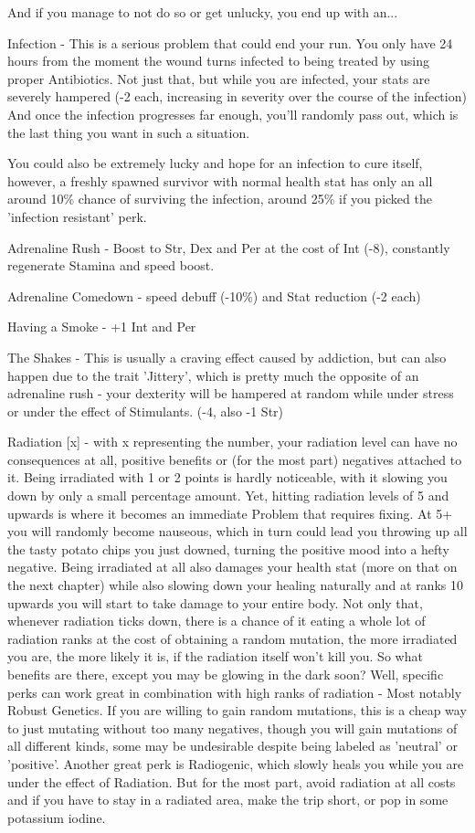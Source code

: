 \documentclass[11pt]{report}
\begin{document}
And if you manage to not do so or get unlucky, you end up with an...

Infection - This is a serious problem that could end your run. You only have 24 hours from the moment the wound turns infected to being treated by using proper Antibiotics. Not just that, but while you are infected, your stats are severely hampered (-2 each, increasing in severity over the course of the infection) And once the infection progresses far enough, you'll randomly pass out, which is the last thing you want in such a situation.

You could also be extremely lucky and hope for an infection to cure itself, however, a freshly spawned survivor with normal health stat has only an all around 10\% chance of surviving the infection, around 25\% if you picked the 'infection resistant' perk.

Adrenaline Rush - Boost to Str, Dex and Per at the cost of Int (-8), constantly regenerate Stamina and speed boost.

Adrenaline Comedown - speed debuff (-10\%) and Stat reduction (-2 each)

Having a Smoke - +1 Int and Per

The Shakes - This is usually a craving effect caused by addiction, but can also happen due to the trait 'Jittery', which is pretty much the opposite of an adrenaline rush - your dexterity will be hampered at random while under stress or under the effect of Stimulants. (-4, also -1 Str)

Radiation [x] - with x representing the number, your radiation level can have no consequences at all, positive benefits or (for the most part) negatives attached to it. Being irradiated with 1 or 2 points is hardly noticeable, with it slowing you down by only a small percentage amount. Yet, hitting radiation levels of 5 and upwards is where it becomes an immediate Problem that requires fixing. At 5+ you will randomly become nauseous, which in turn could lead you throwing up all the tasty potato chips you just downed, turning the positive mood into a hefty negative. Being irradiated at all also damages your health stat (more on that on the next chapter) while also slowing down your healing naturally and at ranks 10 upwards you will start to take damage to your entire body. Not only that, whenever radiation ticks down, there is a chance of it eating a whole lot of radiation ranks at the cost of obtaining a random mutation, the more irradiated you are, the more likely it is, if the radiation itself won't kill you. So what benefits are there, except you may be glowing in the dark soon? Well, specific perks can work great in combination with high ranks of radiation - Most notably Robust Genetics. If you are willing to gain random mutations, this is a cheap way to just mutating without too many negatives, though you will gain mutations of all different kinds, some may be undesirable despite being labeled as 'neutral' or 'positive'. Another great perk is Radiogenic, which slowly heals you while you are under the effect of Radiation. But for the most part, avoid radiation at all costs and if you have to stay in a radiated area, make the trip short, or pop in some potassium iodine.
\end{document}
